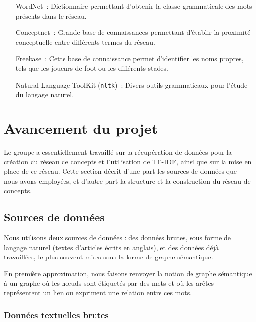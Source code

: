 \documentclass[a4paper, 12pt]{article}
\newcommand{\pyt}[1]{\texttt{#1}}%
\begin{document}
\begin{itemize}
	\item[WordNet~: ]Dictionnaire permettant d'obtenir la classe grammaticale des mots présents dans le réseau.
	\item[Conceptnet~: ]Grande base de connaissances permettant d'établir la proximité conceptuelle entre différents termes du réseau.
	\item[Freebase~: ]Cette base de connaissance permet d'identifier les noms propres, tels que les joueurs de foot ou les différents stades.
	\item[Natural Language ToolKit (\pyt{nltk})~: ]Divers outils grammaticaux pour l'étude du langage naturel.
\end{itemize}



\section{Avancement du projet}

Le groupe a essentiellement travaillé sur la récupération de données pour la création du réseau de concepts et l'utilisation de TF-IDF, ainsi que sur la mise en place de ce réseau. Cette section décrit d'une part les sources de données que nous avons employées, et d'autre part la structure et la construction du réseau de concepts.

\subsection{Sources de données}

Nous utilisons deux sources de données : des données brutes, sous forme de langage naturel (textes d'articles écrits en anglais), et des données déjà travaillées, le plus souvent mises sous la forme de graphe sémantique.

\begin{definition}
En première approximation, nous faisons renvoyer la notion de graphe sémantique à un graphe où les nœuds sont étiquetés par des mots et où les arêtes représentent un lien ou expriment une relation entre ces mots.
\end{definition}


\subsubsection{Données textuelles brutes}
\end{document}
